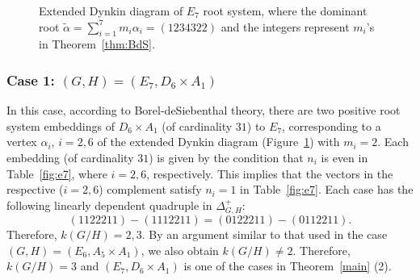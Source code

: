 \documentclass{amsart}
\theoremstyle{definition}
\theoremstyle{remark}
\numberwithin{equation}{section}
\begin{document}
\begin{figure}[H]
\centering
{}
\caption{Extended Dynkin diagram of $E_{7}$ root system, where the dominant root $\widetilde{\alpha}=\sum_{i=1}^{7}m_{i}\alpha_{i}=(1234322)$ and the integers represent $m_{i}$'s in Theorem~\ref{thm:BdS}.}\label{fig:e7dd}
\end{figure}

\subsubsection{Case 1: $(G,H)=(E_{7},D_6\times A_{1})$}
\label{sect:9.2.1}
In this case, according to Borel-deSiebenthal theory,
there are two positive root system embeddings of $D_{6}\times A_{1}$ (of cardinality $31$) to $E_{7}$, corresponding to a vertex $\alpha_{i}$, $i=2,6$ of the extended Dynkin diagram (Figure~\ref{fig:e7dd}) with $m_{i}=2$.
Each embedding (of cardinality $31$) is given by the condition that $n_{i}$ is even in Table~\ref{fig:e7}, where $i=2,6$, respectively.
This implies that the vectors in the respective ($i=2,6$) complement satisfy $n_{i}=1$ in Table~\ref{fig:e7}.
Each case has the following linearly dependent quadruple in $\Delta^{+}_{G,H}$:
\[
(1122211)-(1112211)=(0122211)-(0112211).
\]
Therefore, $k(G/H)=2,3$.
By an argument similar to that used in the case $(G,H)=(E_{6},A_{5}\times A_{1})$, we also obtain $k(G/H)\not=2$.
Therefore, $k(G/H)=3$ and $(E_{7},D_{6}\times A_{1})$ is one of the cases in Theorem~\ref{main} (2).
\end{document}
